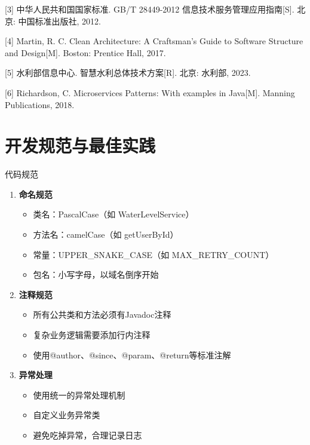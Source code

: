 {[}3{]} 中华人民共和国国家标准. GB/T 28449-2012 信息技术服务管理应用指南{[}S{]}. 北京: 中国标准出版社, 2012.

{[}4{]} Martin, R. C. Clean Architecture: A Craftsman's Guide to Software Structure and Design{[}M{]}. Boston: Prentice Hall, 2017.

{[}5{]} 水利部信息中心. 智慧水利总体技术方案{[}R{]}. 北京: 水利部, 2023.

{[}6{]} Richardson, C. Microservices Patterns: With examples in Java{[}M{]}. Manning Publications, 2018.

\section{开发规范与最佳实践}

 代码规范

\begin{enumerate}
\def\labelenumi{\arabic{enumi}.}
\tightlist
\item
  \textbf{命名规范}

  \begin{itemize}
  \tightlist
  \item
    类名：PascalCase（如 WaterLevelService）
  \item
    方法名：camelCase（如 getUserById）
  \item
    常量：UPPER\_SNAKE\_CASE（如 MAX\_RETRY\_COUNT）
  \item
    包名：小写字母，以域名倒序开始
  \end{itemize}
\item
  \textbf{注释规范}

  \begin{itemize}
  \tightlist
  \item
    所有公共类和方法必须有Javadoc注释
  \item
    复杂业务逻辑需要添加行内注释
  \item
    使用@author、@since、@param、@return等标准注解
  \end{itemize}
\item
  \textbf{异常处理}

  \begin{itemize}
  \tightlist
  \item
    使用统一的异常处理机制
  \item
    自定义业务异常类
  \item
    避免吃掉异常，合理记录日志
  \end{itemize}
\end{enumerate}

